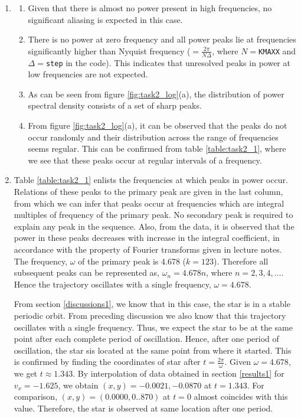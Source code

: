 \documentclass[a4paper]{article}
\begin{document}
		\begin{enumerate}
		
			\item \begin{enumerate}
				\item Given that there is almost no power present in high frequencies, no significant aliasing is expected in this case.
				\item There is no power at zero frequency and all power peaks lie at frequencies significantly higher than Nyquist frequency (\(= \frac{2 \pi}{N \Delta}\), where \(N=\)\texttt{KMAXX} and \(\Delta=\)\texttt{step} in the code). This indicates that unresolved peaks in power at low frequencies are not expected.
				\item As can be seen from figure \ref{fig:task2_log}(a), the distribution of power spectral density consists of a set of sharp peaks.
				\item From figure \ref{fig:task2_log}(a), it can be observed that the peaks do not occur randomly and their distribution across the range of frequencies seems regular. This can be confirmed from table \ref{table:task2_1}, where we see that these peaks occur at regular intervals of a frequency. 
			\end{enumerate}
		
			\item Table \ref{table:task2_1} enlists the frequencies at which peaks in power occur. Relations of these peaks to the primary peak are given in the last column, from which we can infer that peaks occur at frequencies which are integral multiples of frequency of the primary peak. No secondary peak is required to explain any peak in the sequence. Also, from the data, it is observed that the power in these peaks decreases with increase in the integral coefficient, in accordance with the property of Fourier transforms given in lecture notes. The frequency, \(\omega\) of the primary peak is 4.678 (\(k=123\)). Therefore all subsequent peaks can be represented as, \(\omega_n=4.678n\), where \(n=2, 3, 4, \dots\). Hence the trajectory oscillates with a single frequency, \(\omega = 4.678\).
			
			From section \ref{discussions1}, we know that in this case, the star is in a stable periodic orbit. From preceding discussion we also know that this trajectory oscillates with a single frequency. Thus, we expect the star to be at the same point after each complete period of oscillation. Hence, after one period of oscillation, the star sis located at the same point from where it started. This is confirmed by finding the coordinates of star after \(t=\frac{2\pi}{\omega}\). Given \(\omega=4.678\), we get \(t \approx 1.343\). By interpolation of data obtained in section \ref{results1} for \(v_x=-1.625\), we obtain \((x,y)={-0.0021,-0.0870}\) at \(t=1.343\). For comparison, \((x,y)=(0.0000,0..870)\) at \(t=0\) almost coincides with this value. Therefore, the star is observed at same location after one period. 
			

\end{enumerate}
\end{document}
